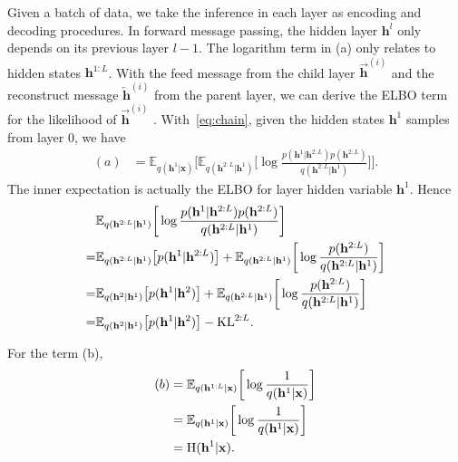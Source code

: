 \documentclass[conference]{IEEEtran}
\begin{document}
Given a batch of data, we take the inference in each layer as encoding and decoding procedures. In forward message passing, the hidden layer $\mathbf{h}^l$  only depends on its previous layer $l-1$. 
The logarithm term in (a) only relates to hidden states $\mathbf{h}^{1:L}$.  With the feed message from the child layer $\overrightarrow{\mathbf{h}}^{(i)}$ and the reconstruct message $\overleftarrow{\mathbf{h}}^{(i)}$  from the parent layer, we can derive the ELBO term for the likelihood of  $\overrightarrow{\mathbf{h}}^{(i)}$ .  With~\eqref{eq:chain}, given the hidden states $\mathbf{h}^1$ samples from layer 0, we have 
\begin{align} \label{eq:kl_a}
(a)  &=   \mathbb{E}_{q(\mathbf{h}^{1}|\mathbf{x})} \bigg[  \mathbb{E}_{q(\mathbf{h}^{2:L}|\mathbf{h}^1)} \bigg[ \log  \frac{p( \mathbf{h}^{1}|  \mathbf{h}^{2:L}) p( \mathbf{h}^{2:L})  }{ q(\mathbf{h}^{2:L}|\mathbf{h}^1)}  \bigg]    \bigg] .
\end{align}
The inner expectation is actually the ELBO for layer hidden variable $\mathbf{h}^1$. Hence
\begin{align} \notag
 &\mathbb{E}_{q(\mathbf{h}^{2:L}|\mathbf{h}^1)} \bigg[ \log  \frac{p( \mathbf{h}^{1}|  \mathbf{h}^{2:L}) p( \mathbf{h}^{2:L})  }{ q(\mathbf{h}^{2:L}|\mathbf{h}^1)}  \bigg]   \\ \notag
 =&\mathbb{E}_{q(\mathbf{h}^{2:L}|\mathbf{h}^1)} \big[  p( \mathbf{h}^{1}|  \mathbf{h}^{2:L})    \big] + \mathbb{E}_{q(\mathbf{h}^{2:L}|\mathbf{h}^1)} \bigg[ \log  \frac{ p( \mathbf{h}^{2:L})   }{ q(\mathbf{h}^{2:L}|\mathbf{h}^1)}  \bigg]  \\  \label{eq:a_inner}
 =&  \mathbb{E}_{q(\mathbf{h}^{2}|\mathbf{h}^1)} \big[  p( \mathbf{h}^{1}|  \mathbf{h}^{2})    \big] + \mathbb{E}_{q(\mathbf{h}^{2:L}|\mathbf{h}^1)} \bigg[ \log  \frac{ p( \mathbf{h}^{2:L})   }{ q(\mathbf{h}^{2:L}|\mathbf{h}^1)}  \bigg] \\ \notag
  =&  \mathbb{E}_{q(\mathbf{h}^{2}|\mathbf{h}^1)} \big[  p( \mathbf{h}^{1}|  \mathbf{h}^{2})    \big] - \text{KL}^{2:L} .
\end{align}

For the term (b),
\begin{align} \notag
 (b) & = \mathbb{E}_{q(\mathbf{h}^{1:L} | \mathbf{x})} \bigg[ \log \frac{1}{q(\mathbf{h}^{1}|\mathbf{x}) } \bigg] \\ \notag
&=  \mathbb{E}_{q(\mathbf{h}^{1} | \mathbf{x})} \bigg[ \log \frac{1}{q(\mathbf{h}^{1}|\mathbf{x}) } \bigg] \\ \label{eq:kl_b}
& = \text{H}(\mathbf{h}^{1}|\mathbf{x}) .
\end{align}
\end{document}
